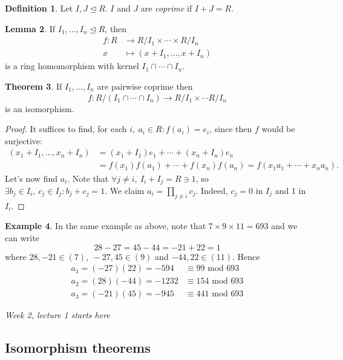 \documentclass[a4paper]{article}
\newcommand{\Mod}{\text{ mod }}
\theoremstyle{definition}
\newtheorem{defn}{Definition}[subsection]
\newtheorem{thm}[defn]{Theorem}
\newtheorem{lemma}[defn]{Lemma}
\newtheorem{example}[defn]{Example}
\begin{document}
\begin{defn}
Let $I,J\unlhd R$. $I$ and $J$ are \textit{coprime} if $I+J=R$.
\end{defn}

\begin{lemma}
If $I_1,\ldots,I_n\unlhd R$, then
\[
\begin{aligned}
f:R&\rightarrow R/I_1\times\cdots\times R/I_n\\
x&\mapsto (x+I_1,\ldots,x+I_n)
\end{aligned}
\]
is a ring homomorphism with kernel $I_1\cap\cdots\cap I_n$.
\end{lemma}

\begin{thm}
If $I_1,\ldots,I_n$ are pairwise coprime then
\[
\overline f:R/(I_1\cap\cdots\cap I_n) \rightarrow R/I_1\times\cdots R/I_n
\]
is an isomorphism.
\end{thm}
\begin{proof}
It suffices to find, for each $i,\ a_i\in R:f(a_i)=e_i$, since then $f$ would be surjective:
\[
\begin{aligned}
(x_1+I_1,\ldots,x_n+I_n)&=(x_1+I_1)e_1+\cdots+(x_n+I_n)e_n\\&=f(x_1)f(a_1)+\cdots+f(x_n)f(a_n)=f(x_1a_1+\cdots+x_na_n).
\end{aligned}
\]
Let's now find $a_i$. Note that $\forall j\neq i,\ I_i+I_j=R\ni 1$, so $\exists b_j\in I_i,\ c_j\in I_j:b_j+c_j=1$. We claim $a_i=\prod_{j\neq i} c_j$. Indeed, $c_j=0$ in $I_j$ and 1 in $I_i$.
\end{proof}

\begin{example}
In the same example as above, note that $7\times 9\times 11=693$ and we can write
\[
28-27=45-44=-21+22=1
\]
where $28,-21\in (7),\ -27,45\in(9)$ and $-44,22\in(11)$. Hence
\[
\begin{aligned}
a_1=(-27)(22)=-594&\equiv 99\Mod 693 \\
a_2=(28)(-44)=-1232&\equiv 154\Mod 693 \\
a_3=(-21)(45)=-945&\equiv 441\Mod 693
\end{aligned}
\]
\end{example}

\begin{flushright}
\textit{Week 2, lecture 1 starts here}
\end{flushright}

\subsection{Isomorphism theorems}
\end{document}
